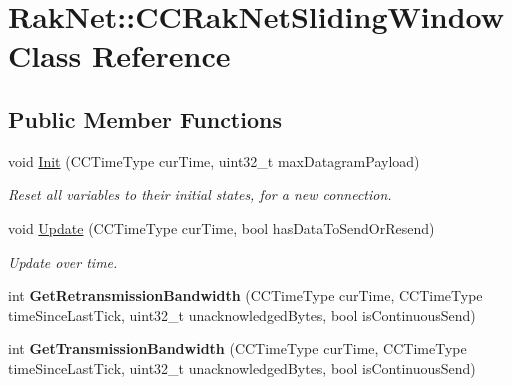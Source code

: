 \hypertarget{class_rak_net_1_1_c_c_rak_net_sliding_window}{\section{Rak\-Net\-:\-:C\-C\-Rak\-Net\-Sliding\-Window Class Reference}
\label{class_rak_net_1_1_c_c_rak_net_sliding_window}
}
\subsection*{Public Member Functions}
\begin{DoxyCompactItemize}
\item 
\hypertarget{class_rak_net_1_1_c_c_rak_net_sliding_window_aa6c4aa85156095c2b02069d3d736c8cf}{void \hyperlink{class_rak_net_1_1_c_c_rak_net_sliding_window_aa6c4aa85156095c2b02069d3d736c8cf}{Init} (C\-C\-Time\-Type cur\-Time, uint32\-\_\-t max\-Datagram\-Payload)}\label{class_rak_net_1_1_c_c_rak_net_sliding_window_aa6c4aa85156095c2b02069d3d736c8cf}

\begin{DoxyCompactList}\small\item\em Reset all variables to their initial states, for a new connection. \end{DoxyCompactList}\item 
\hypertarget{class_rak_net_1_1_c_c_rak_net_sliding_window_abcf47c3afe6ff15093a31594ab812fc6}{void \hyperlink{class_rak_net_1_1_c_c_rak_net_sliding_window_abcf47c3afe6ff15093a31594ab812fc6}{Update} (C\-C\-Time\-Type cur\-Time, bool has\-Data\-To\-Send\-Or\-Resend)}\label{class_rak_net_1_1_c_c_rak_net_sliding_window_abcf47c3afe6ff15093a31594ab812fc6}

\begin{DoxyCompactList}\small\item\em Update over time. \end{DoxyCompactList}\item 
\hypertarget{class_rak_net_1_1_c_c_rak_net_sliding_window_a07ea5447b3dcd03cb405956b3805fbbd}{int {\bfseries Get\-Retransmission\-Bandwidth} (C\-C\-Time\-Type cur\-Time, C\-C\-Time\-Type time\-Since\-Last\-Tick, uint32\-\_\-t unacknowledged\-Bytes, bool is\-Continuous\-Send)}\label{class_rak_net_1_1_c_c_rak_net_sliding_window_a07ea5447b3dcd03cb405956b3805fbbd}

\item 
\hypertarget{class_rak_net_1_1_c_c_rak_net_sliding_window_a2c3861abda9c962acf93f2f870742005}{int {\bfseries Get\-Transmission\-Bandwidth} (C\-C\-Time\-Type cur\-Time, C\-C\-Time\-Type time\-Since\-Last\-Tick, uint32\-\_\-t unacknowledged\-Bytes, bool is\-Continuous\-Send)}\label{class_rak_net_1_1_c_c_rak_net_sliding_window_a2c3861abda9c962acf93f2f870742005}


\end{DoxyCompactItemize}
